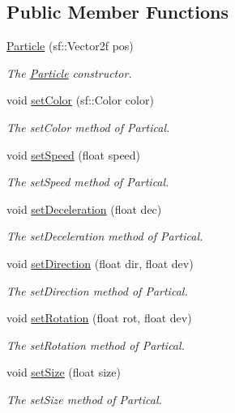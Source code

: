 \subsection*{Public Member Functions}
\begin{DoxyCompactItemize}
\item 
\hyperlink{class_particle_aeb1cb89169a8cd1ebdf9620e6f2f6566}{Particle} (sf\+::\+Vector2f pos)
\begin{DoxyCompactList}\small\item\em The \hyperlink{class_particle}{Particle} constructor. \end{DoxyCompactList}\item 
void \hyperlink{class_particle_ad7dcfb0c3c1b11d35d321b7918bd546f}{set\+Color} (sf\+::\+Color color)
\begin{DoxyCompactList}\small\item\em The set\+Color method of Partical. \end{DoxyCompactList}\item 
void \hyperlink{class_particle_ac57a8908b8ab1a1b9bb29aa02e347f56}{set\+Speed} (float speed)
\begin{DoxyCompactList}\small\item\em The set\+Speed method of Partical. \end{DoxyCompactList}\item 
void \hyperlink{class_particle_a87a76728e3b91795c52beb9257e7e9df}{set\+Deceleration} (float dec)
\begin{DoxyCompactList}\small\item\em The set\+Deceleration method of Partical. \end{DoxyCompactList}\item 
void \hyperlink{class_particle_a2e6c588a1cb9607ef70f3d97edefd780}{set\+Direction} (float dir, float dev)
\begin{DoxyCompactList}\small\item\em The set\+Direction method of Partical. \end{DoxyCompactList}\item 
void \hyperlink{class_particle_a8472fac4770b3d198426e480ccef97d5}{set\+Rotation} (float rot, float dev)
\begin{DoxyCompactList}\small\item\em The set\+Rotation method of Partical. \end{DoxyCompactList}\item 
void \hyperlink{class_particle_a9cbcb7c7f4b1f1d11033a9eea16bae2c}{set\+Size} (float size)
\begin{DoxyCompactList}\small\item\em The set\+Size method of Partical. \end{DoxyCompactList}\item 

\end{DoxyCompactItemize}
